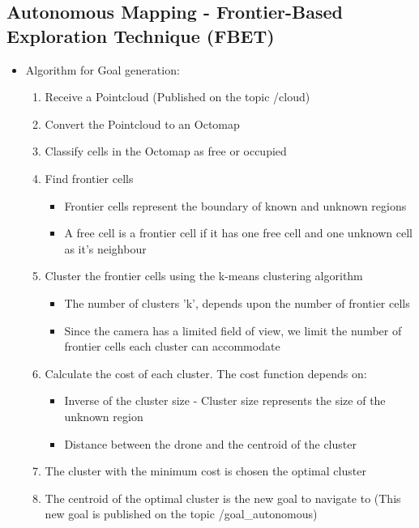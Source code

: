 \documentclass[a4paper,12pt,oneside]{book}
\begin{document}
\subsection*{Autonomous Mapping - Frontier-Based Exploration Technique (FBET)}
\begin{itemize}
	\item Algorithm for Goal generation:
	\begin{enumerate}
		\item Receive a Pointcloud (Published on the topic /cloud)
		\item Convert the Pointcloud to an Octomap 
		\item Classify cells in the Octomap as free or occupied
		\item Find frontier cells
		\begin{itemize}
			\item Frontier cells represent the boundary of known and unknown regions
			\item A free cell is a frontier cell if it has one free cell and one unknown cell as it's neighbour
		\end{itemize}
		\item Cluster the frontier cells using the k-means clustering algorithm
			\begin{itemize}
				\item The number of clusters 'k', depends upon the number of frontier cells
				\item Since the camera has a limited field of view, we limit the number of frontier cells each cluster can accommodate
			\end{itemize}
		\item Calculate the cost of each cluster. The cost function depends on:
		\begin{itemize}
			\item Inverse of the cluster size - Cluster size represents the size of the unknown region
			\item Distance between the drone and the centroid of the cluster
		\end{itemize}
		\item The cluster with the minimum cost is chosen the optimal cluster
		\item The centroid of the optimal cluster is the new goal to navigate to (This new goal is published on the topic /goal\_autonomous)
	\end{enumerate}
	

\end{itemize}
\end{document}
